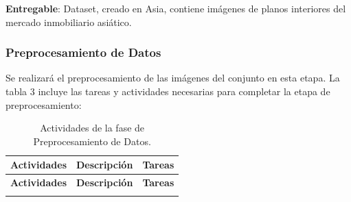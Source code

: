 \textbf{Entregable}: Dataset, creado en Asia, contiene imágenes de planos interiores del mercado inmobiliario asiático.


\subsubsection{Preprocesamiento de Datos}
Se realizará el preprocesamiento de las imágenes del conjunto en esta etapa. La tabla 3 incluye las tareas y actividades necesarias para completar la etapa de preprocesamiento:
\vspace{2ex}


\begin{longtable}{|p{3cm}|p{3cm}|p{9cm}|}
    \caption{Actividades de la fase de Preprocesamiento de Datos.}
    \label{tabla:preprocesamiento}\\
    \hline
    \textbf{Actividades} & \textbf{Descripción} & \textbf{Tareas} \\
    \hline
    \endfirsthead

    \hline
    \textbf{Actividades} & \textbf{Descripción} & \textbf{Tareas} \\
    \hline
    \endhead

    \hline
    \endfoot

    \hline
    \endlastfoot


\end{longtable}
